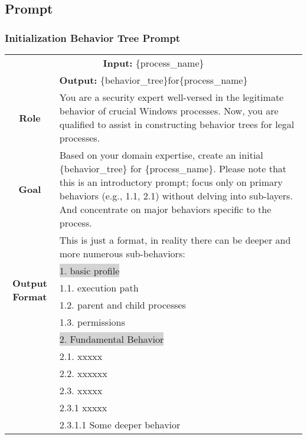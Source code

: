 \subsection{Prompt}


\subsubsection{Initialization Behavior Tree Prompt}
\label{prompt-init-tree}
\begin{tabularx}{\textwidth}{|c|X|}
\hline
\multicolumn{2}{|c|}{\textbf{Input:} \colorbox{codegreen}{\{process\_name\}}} \\
\multicolumn{2}{|c|}{\textbf{Output:} \colorbox{SoftRed}{\{behavior\_tree\}}for\colorbox{codegreen}{\{process\_name\}}} \\
\hline
\textbf{Role} & You are a security expert well-versed in the legitimate behavior of crucial Windows processes. Now, you are qualified to assist in constructing behavior trees for legal processes. \\
\hline
\textbf{Goal} & 
Based on your domain expertise, create an initial \colorbox{SoftRed}{\{behavior\_tree\}} for \colorbox{codegreen}{\{process\_name\}}. 
Please note that this is an introductory prompt; focus only on primary behaviors (e.g., 1.1, 2.1) without delving into sub-layers. And concentrate on major behaviors specific to the process.
\\ 
\hline
\multirow{6}{*}{\textbf{Output Format}} & This is just a format, in reality there can be deeper and more numerous sub-behaviors: \\
& \colorbox{lightgray}{1. basic profile} \\
& 1.1. execution path \\
& 1.2. parent and child processes \\
& 1.3. permissions \\
& \colorbox{lightgray}{2. Fundamental Behavior} \\
& 2.1. xxxxx \\
& 2.2. xxxxxx \\
& 2.3. xxxxx \\
& 2.3.1 xxxxx \\
& 2.3.1.1 Some deeper behavior \\


\end{tabularx}
